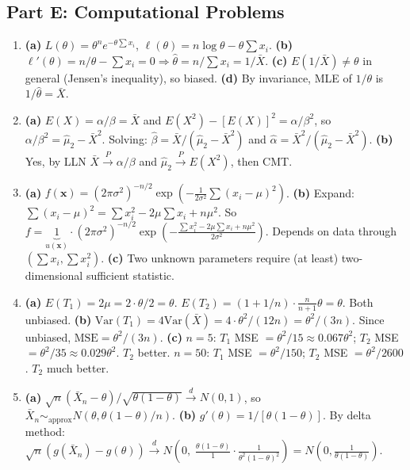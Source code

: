 \documentclass[11pt]{article}
\begin{document}
\subsection*{Part E: Computational Problems}

\begin{enumerate}[start=41]
\item \textbf{(a)} $L(\theta) = \theta^n e^{-\theta \sum x_i}$, $\ell(\theta) = n\log\theta - \theta\sum x_i$. \textbf{(b)} $\ell'(\theta) = n/\theta - \sum x_i = 0 \Rightarrow \hat\theta = n/\sum x_i = 1/\bar X$. \textbf{(c)} $E(1/\bar X) \ne \theta$ in general (Jensen's inequality), so biased. \textbf{(d)} By invariance, MLE of $1/\theta$ is $1/\hat\theta = \bar X$.

\item \textbf{(a)} $E(X) = \alpha/\beta = \bar X$ and $E(X^2) - [E(X)]^2 = \alpha/\beta^2$, so $\alpha/\beta^2 = \hat\mu_2 - \bar X^2$. Solving: $\hat\beta = \bar X/(\hat\mu_2 - \bar X^2)$ and $\hat\alpha = \bar X^2/(\hat\mu_2 - \bar X^2)$. \textbf{(b)} Yes, by LLN $\bar X \xrightarrow{P} \alpha/\beta$ and $\hat\mu_2 \xrightarrow{P} E(X^2)$, then CMT.

\item \textbf{(a)} $f(\mathbf{x}) = (2\pi\sigma^2)^{-n/2}\exp\left(-\frac{1}{2\sigma^2}\sum(x_i - \mu)^2\right)$. \textbf{(b)} Expand: $\sum(x_i-\mu)^2 = \sum x_i^2 - 2\mu\sum x_i + n\mu^2$. So $f = \underbrace{1}_{u(\mathbf{x})} \cdot (2\pi\sigma^2)^{-n/2}\exp\left(-\frac{\sum x_i^2 - 2\mu\sum x_i + n\mu^2}{2\sigma^2}\right)$. Depends on data through $(\sum x_i, \sum x_i^2)$. \textbf{(c)} Two unknown parameters require (at least) two-dimensional sufficient statistic.

\item \textbf{(a)} $E(T_1) = 2\mu = 2\cdot\theta/2 = \theta$. $E(T_2) = (1+1/n)\cdot\frac{n}{n+1}\theta = \theta$. Both unbiased. \textbf{(b)} $\text{Var}(T_1) = 4\text{Var}(\bar X) = 4\cdot\theta^2/(12n) = \theta^2/(3n)$. Since unbiased, $\text{MSE} = \theta^2/(3n)$. \textbf{(c)} $n=5$: $T_1$ MSE $= \theta^2/15 \approx 0.067\theta^2$; $T_2$ MSE $= \theta^2/35 \approx 0.029\theta^2$. $T_2$ better. $n=50$: $T_1$ MSE $= \theta^2/150$; $T_2$ MSE $= \theta^2/2600$. $T_2$ much better.

\item \textbf{(a)} $\sqrt{n}(\bar X_n - \theta)/\sqrt{\theta(1-\theta)} \xrightarrow{d} N(0,1)$, so $\bar X_n \sim_{\text{approx}} N(\theta, \theta(1-\theta)/n)$. \textbf{(b)} $g'(\theta) = 1/[\theta(1-\theta)]$. By delta method: $\sqrt{n}(g(\bar X_n) - g(\theta)) \xrightarrow{d} N\!\left(0,\; \frac{\theta(1-\theta)}{1} \cdot \frac{1}{\theta^2(1-\theta)^2}\right) = N\!\left(0, \frac{1}{\theta(1-\theta)}\right)$.


\end{enumerate}
\end{document}
